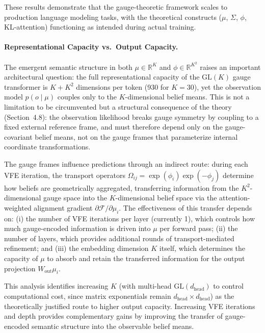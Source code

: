 \documentclass[twoside,11pt]{article}
\begin{document}
These results demonstrate that the gauge-theoretic framework scales to production language modeling tasks, with the theoretical constructs ($\mu$, $\Sigma$, $\phi$, KL-attention) functioning as intended during actual training.

\paragraph{Representational Capacity vs.\ Output Capacity.}
The emergent semantic structure in both $\mu \in \mathbb{R}^K$ and $\phi \in \mathbb{R}^{K^2}$ raises an important architectural question: the full representational capacity of the $\mathrm{GL}(K)$ gauge transformer is $K + K^2$ dimensions per token (930 for $K=30$), yet the observation model $p(o \mid \mu)$ couples only to the $K$-dimensional belief means. This is not a limitation to be circumvented but a structural consequence of the theory (Section~4.8): the observation likelihood breaks gauge symmetry by coupling to a fixed external reference frame, and must therefore depend only on the gauge-covariant belief means, not on the gauge frames that parameterize internal coordinate transformations.

The gauge frames influence predictions through an indirect route: during each VFE iteration, the transport operators $\Omega_{ij} = \exp(\phi_i)\exp(-\phi_j)$ determine how beliefs are geometrically aggregated, transferring information from the $K^2$-dimensional gauge space into the $K$-dimensional belief space via the attention-weighted alignment gradient $\partial \mathcal{F}/\partial \mu_i$. The effectiveness of this transfer depends on: (i) the number of VFE iterations per layer (currently 1), which controls how much gauge-encoded information is driven into $\mu$ per forward pass; (ii) the number of layers, which provides additional rounds of transport-mediated refinement; and (iii) the embedding dimension $K$ itself, which determines the capacity of $\mu$ to absorb and retain the transferred information for the output projection $W_{\text{out}} \mu_i$.

This analysis identifies increasing $K$ (with multi-head $\mathrm{GL}(d_{\text{head}})$ to control computational cost, since matrix exponentials remain $d_{\text{head}} \times d_{\text{head}}$) as the theoretically justified route to higher output capacity. Increasing VFE iterations and depth provides complementary gains by improving the transfer of gauge-encoded semantic structure into the observable belief means.
\end{document}
